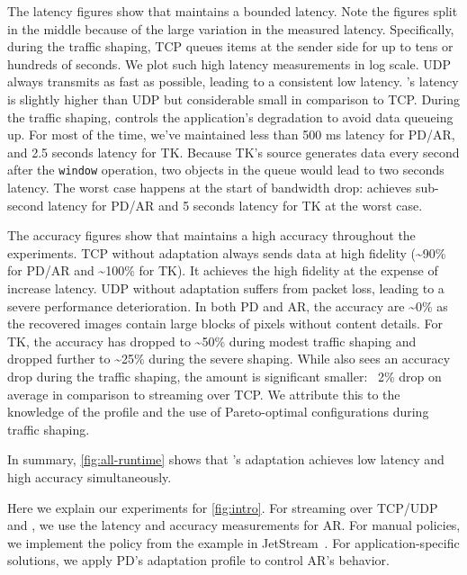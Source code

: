The latency figures show that \sysname{} maintains a bounded latency. Note the
figures split in the middle because of the large variation in the measured
latency. Specifically, during the traffic shaping, TCP queues items at the
sender side for up to tens or hundreds of seconds. We plot such high latency
measurements in log scale. UDP always transmits as fast as possible, leading to
a consistent low latency. \sysname{}'s latency is slightly higher than UDP but
considerable small in comparison to TCP\@. During the traffic shaping,
\sysname{} controls the application's degradation to avoid data queueing up. For
most of the time, we've maintained less than 500 ms latency for PD/AR, and 2.5
seconds latency for TK\@. Because TK's source generates data every second after
the \texttt{window} operation, two objects in the queue would lead to two
seconds latency. The worst case happens at the start of bandwidth
drop: \sysname{} achieves sub-second latency for PD/AR and 5 seconds latency for
TK at the worst case.

The accuracy figures show that \sysname{} maintains a high accuracy throughout
the experiments. TCP without adaptation always sends data at high fidelity
(\textasciitilde 90\% for PD/AR and \textasciitilde 100\% for TK). It achieves
the high fidelity at the expense of increase latency. UDP without adaptation
suffers from packet loss, leading to a severe performance deterioration.  In
both PD and AR, the accuracy are \textasciitilde 0\% as the recovered images
contain large blocks of pixels without content details. For TK, the accuracy has
dropped to \textasciitilde 50\% during modest traffic shaping and dropped
further to \textasciitilde 25\% during the severe shaping. While \sysname{} also
sees an accuracy drop during the traffic shaping, the amount is significant
smaller: ~2\% drop on average in comparison to streaming over TCP\@.
We attribute this to the knowledge of the profile and the use of Pareto-optimal configurations during traffic shaping.

In summary, \autoref{fig:all-runtime} shows that \sysname{}'s adaptation achieves
low latency and high accuracy simultaneously.

 Here we explain our experiments for
\autoref{fig:intro}. For streaming over TCP/UDP and \sysname{}, we use the
latency and accuracy measurements for AR\@. For manual policies, we implement the
policy from the example in JetStream~\cite{rabkin2014aggregation}. For
application-specific solutions, we apply PD's adaptation profile to control AR's
behavior.


